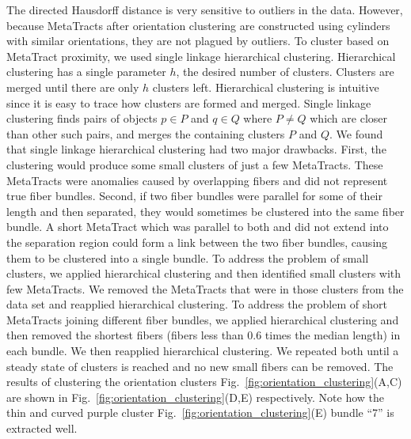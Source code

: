 The directed Hausdorff distance is very sensitive to outliers in the data.
However, because MetaTracts after orientation clustering are constructed using cylinders with similar orientations, they are not plagued by outliers.
To cluster based on MetaTract proximity, we used single linkage hierarchical clustering.
Hierarchical clustering has a single parameter $h$, the desired number of clusters.
Clusters are merged until there are only $h$ clusters left.
Hierarchical clustering is intuitive since it is easy to trace how clusters are formed and merged.
Single linkage clustering finds pairs of objects $p \in P$ and $q \in Q$ where $P \neq Q$ which are closer than other such pairs, and merges the containing clusters $P$ and $Q$.
We found that single linkage hierarchical clustering had two major drawbacks.
First, the clustering would produce some small clusters of just a few MetaTracts.
These MetaTracts were anomalies caused by overlapping fibers and did not represent true fiber bundles.
Second, if two fiber bundles were parallel for some of their length and then separated, they would sometimes be clustered into the same fiber bundle.
A short MetaTract which was parallel to both and did not extend into the separation region could form a link between the two fiber bundles, causing them to be clustered into a single bundle.
To address the problem of small clusters, we applied hierarchical clustering and then identified small clusters with few MetaTracts.
We removed the MetaTracts that were in those clusters from the data set and reapplied hierarchical clustering.
To address the problem of short MetaTracts joining different fiber bundles, we applied hierarchical clustering and then removed the
shortest fibers (fibers less than 0.6 times the median length) in each bundle. We then reapplied hierarchical clustering.
We repeated both until a steady state of clusters is reached and no new small fibers can be removed. The results of clustering the orientation clusters Fig.~\ref{fig:orientation_clustering}(A,C) are shown in Fig.~\ref{fig:orientation_clustering}(D,E) respectively. Note how the thin and curved purple cluster Fig.~\ref{fig:orientation_clustering}(E) bundle ``7'' is extracted well. 



